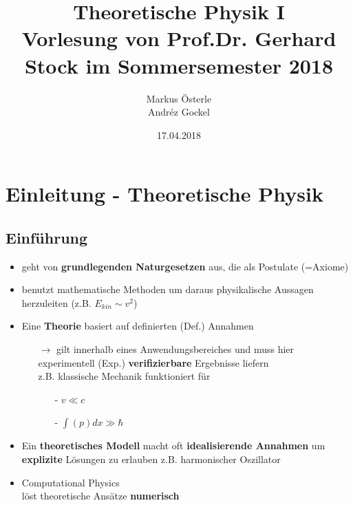 \documentclass[titlepage,12pt,a4paper,ngerman]{report}
\begin{document}
\title{
\Huge Theoretische Physik I \\[1em]
\Large Vorlesung von Prof.Dr. Gerhard Stock im Sommersemester 2018}
\author{Markus Österle \\ Andréz Gockel}
\date{17.04.2018}
\maketitle
\tableofcontents

\chapter*{Einleitung - Theoretische Physik}

\section*{Einführung}
\begin{itemize}
\item geht von \textbf{grundlegenden Naturgesetzen} aus, die als Postulate (=Axiome)
\item benutzt mathematische Methoden um daraus physikalische Aussagen herzuleiten (z.B. $E_{kin}\sim v^2$) 
\item Eine \textbf{Theorie} basiert auf definierten (Def.) Annahmen
\begin{itemize}
	\item[$\rightarrow$] gilt innerhalb eines Anwendungsbereiches und muss hier experimentell (Exp.) \textbf{verifizierbare} Ergebnisse liefern\\
	z.B. klassische Mechanik funktioniert für
	\begin{itemize}
		\item[-] $v\ll c$
		\item[-] $\int(p)dx \gg \hbar$
	\end{itemize}
\end{itemize}
\item Ein \textbf{theoretisches Modell} macht oft \textbf{idealisierende Annahmen} um \textbf{explizite} Lösungen zu erlauben z.B. harmonischer Oszillator
\item Computational Physics\\
löst theoretische Ansätze \textbf{numerisch}
\end{itemize}
\end{document}
